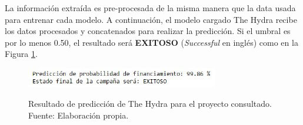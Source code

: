 La información extraída es pre-procesada de la misma manera que la data usada para entrenar cada modelo. A continuación, el modelo cargado The Hydra recibe los datos procesados y concatenados para realizar la predicción. Si el umbral es por lo menos 0.50, el resultado será \textbf{EXITOSO} (\textit{Successful} en inglés) como en la Figura \ref{4:fig41}.

\begin{figure}[!ht]
	\begin{center}
		\includegraphics[width=0.75\textwidth]{4/figures/demo_project_prediction.jpg}
		\caption[Resultado de predicción de The Hydra para el proyecto consultado]{Resultado de predicción de The Hydra para el proyecto consultado.\\
			Fuente: Elaboración propia.}
		\vspace{-0.7cm}
		\label{4:fig41}
	\end{center}
\end{figure}